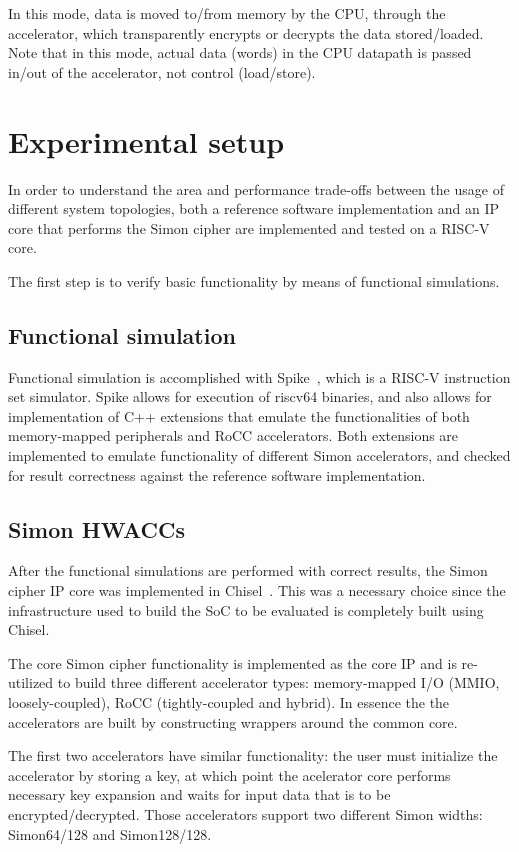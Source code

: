 \documentclass[10pt,conference]{IEEEtran}
\begin{document}
In this mode, data is moved to/from memory by the CPU, through the accelerator,
which transparently encrypts or decrypts the data stored/loaded. Note that in
this mode, actual data (words) in the CPU datapath is passed in/out of the
accelerator, not control (load/store).

\section{Experimental setup}

In order to understand the area and performance trade-offs between the usage of
different system topologies, both a reference software implementation and an IP
core that performs the Simon cipher are implemented and tested on a RISC-V core.

The first step is to verify basic functionality by means of functional simulations.

\subsection{Functional simulation}

Functional simulation is accomplished with Spike~\cite{spike}, which is a RISC-V
instruction set simulator. Spike allows for execution of riscv64 binaries, and
also allows for implementation of C++ extensions that emulate the
functionalities of both memory-mapped peripherals and RoCC accelerators. Both
extensions are implemented to emulate functionality of different Simon
accelerators, and checked for result correctness against the reference software
implementation.


\subsection{Simon HWACCs}

After the functional simulations are performed with correct results, the Simon
cipher IP core was implemented in Chisel~\cite{chisel}. This was a necessary
choice since the infrastructure used to build the SoC to be evaluated is
completely built using Chisel.

The core Simon cipher functionality is implemented as the core IP and is
re-utilized to build three different accelerator types: memory-mapped I/O
(MMIO, loosely-coupled), RoCC (tightly-coupled and hybrid). In essence the the
accelerators are built by constructing wrappers around the common core.

The first two accelerators have similar functionality: the user must initialize the
accelerator by storing a key, at which point the acelerator core performs
necessary key expansion and waits for input data that is to be
encrypted/decrypted. Those accelerators support two different Simon widths:
Simon64/128 and Simon128/128.
\end{document}
